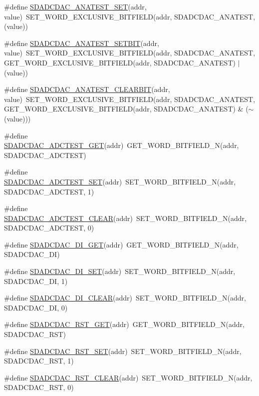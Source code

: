 \begin{DoxyCompactItemize}
\item 
\#define \hyperlink{a00568_a07bb6aef5bd8d90762c61e20fb7a33fa}{SDADCDAC\_\-ANATEST\_\-SET}(addr, value)~SET\_\-WORD\_\-EXCLUSIVE\_\-BITFIELD(addr, SDADCDAC\_\-ANATEST, (value))
\item 
\#define \hyperlink{a00568_a5d71edd9011f1286262d720343b5ed11}{SDADCDAC\_\-ANATEST\_\-SETBIT}(addr, value)~SET\_\-WORD\_\-EXCLUSIVE\_\-BITFIELD(addr, SDADCDAC\_\-ANATEST, GET\_\-WORD\_\-EXCLUSIVE\_\-BITFIELD(addr, SDADCDAC\_\-ANATEST) $|$ (value))
\item 
\#define \hyperlink{a00568_a0cbd28154127e1a621c46989ab21014e}{SDADCDAC\_\-ANATEST\_\-CLEARBIT}(addr, value)~SET\_\-WORD\_\-EXCLUSIVE\_\-BITFIELD(addr, SDADCDAC\_\-ANATEST, GET\_\-WORD\_\-EXCLUSIVE\_\-BITFIELD(addr, SDADCDAC\_\-ANATEST) \& ($\sim$(value)))
\item 
\#define \hyperlink{a00568_ab73f38b699823d24e66ef7cb07092766}{SDADCDAC\_\-ADCTEST\_\-GET}(addr)~GET\_\-WORD\_\-BITFIELD\_\-N(addr, SDADCDAC\_\-ADCTEST)
\item 
\#define \hyperlink{a00568_ae499bed580b787c48939d0a211660120}{SDADCDAC\_\-ADCTEST\_\-SET}(addr)~SET\_\-WORD\_\-BITFIELD\_\-N(addr, SDADCDAC\_\-ADCTEST, 1)
\item 
\#define \hyperlink{a00568_a308bacd7224e41253588b8ef30a85cd8}{SDADCDAC\_\-ADCTEST\_\-CLEAR}(addr)~SET\_\-WORD\_\-BITFIELD\_\-N(addr, SDADCDAC\_\-ADCTEST, 0)
\item 
\#define \hyperlink{a00568_acd1c8a846e88994528589fd21e0c1398}{SDADCDAC\_\-DI\_\-GET}(addr)~GET\_\-WORD\_\-BITFIELD\_\-N(addr, SDADCDAC\_\-DI)
\item 
\#define \hyperlink{a00568_ae1cdbd0680cb3a21a665332fffd7619f}{SDADCDAC\_\-DI\_\-SET}(addr)~SET\_\-WORD\_\-BITFIELD\_\-N(addr, SDADCDAC\_\-DI, 1)
\item 
\#define \hyperlink{a00568_a4b8394013d1840b59ceb31fd31d815cb}{SDADCDAC\_\-DI\_\-CLEAR}(addr)~SET\_\-WORD\_\-BITFIELD\_\-N(addr, SDADCDAC\_\-DI, 0)
\item 
\#define \hyperlink{a00568_a4922c8a314ff13f989b5e9d0a7e110ae}{SDADCDAC\_\-RST\_\-GET}(addr)~GET\_\-WORD\_\-BITFIELD\_\-N(addr, SDADCDAC\_\-RST)
\item 
\#define \hyperlink{a00568_a14ab3f2f9aa707d111a61c32588b662c}{SDADCDAC\_\-RST\_\-SET}(addr)~SET\_\-WORD\_\-BITFIELD\_\-N(addr, SDADCDAC\_\-RST, 1)
\item 
\#define \hyperlink{a00568_a0c73fa1b111f1df348e50f0f9c275798}{SDADCDAC\_\-RST\_\-CLEAR}(addr)~SET\_\-WORD\_\-BITFIELD\_\-N(addr, SDADCDAC\_\-RST, 0)
\item 

\end{DoxyCompactItemize}
